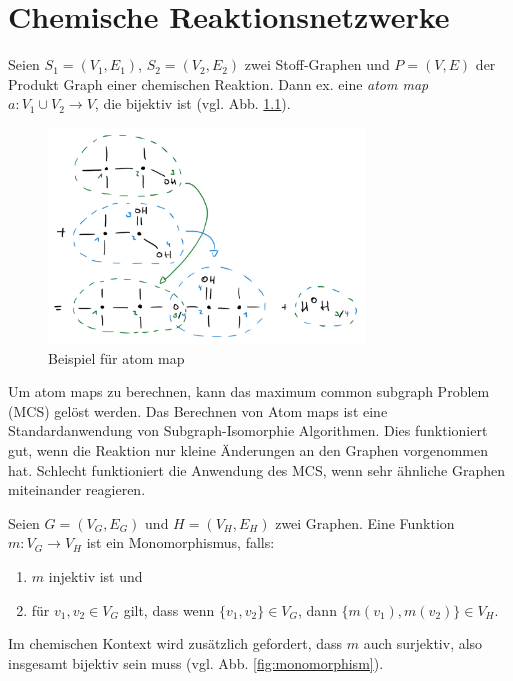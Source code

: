 \chapter{Chemische Reaktionsnetzwerke}

\begin{definition}
    Seien $ S_1 = (V_1, E_1)$, $ S_2 = (V_2, E_2) $ zwei Stoff-Graphen und $ P = (V, E) $ der Produkt Graph einer chemischen Reaktion.
    Dann ex. eine \textit{atom map} $ a : V_1 \cup V_2 \rightarrow V $, die bijektiv ist (vgl. Abb. \ref{fig:atom-map}).
\end{definition}

\begin{figure}
    \centering
    \includegraphics[width=0.75\textwidth]{figures/chem.png}
    \caption{Beispiel für atom map}
    \label{fig:atom-map}
\end{figure}

\begin{remark}
    Um atom maps zu berechnen, kann das maximum common subgraph Problem (MCS) gelöst werden.
    Das Berechnen von Atom maps ist eine Standardanwendung von Subgraph-Isomorphie Algorithmen.
    Dies funktioniert gut, wenn die Reaktion nur kleine Änderungen an den Graphen vorgenommen hat.
    Schlecht funktioniert die Anwendung des MCS, wenn sehr ähnliche Graphen miteinander reagieren.
\end{remark}

\begin{definition}[Monomorphismus]
    Seien $ G = (V_G, E_G) $ und $ H = (V_H, E_H)  $ zwei Graphen.
    Eine Funktion $ m : V_G \rightarrow V_H $ ist ein Monomorphismus, falls:
    \begin{enumerate}
        \item $ m $ injektiv ist und
        \item für $ v_1, v_2 \in V_G $ gilt, dass wenn $ \{ v_1, v_2 \} \in V_G $, dann $ \{ m(v_1), m(v_2) \} \in V_H $.
    \end{enumerate}

    Im chemischen Kontext wird zusätzlich gefordert, dass $ m $ auch surjektiv, also insgesamt bijektiv sein muss (vgl. Abb. \ref{fig:monomorphism}).
\end{definition}

